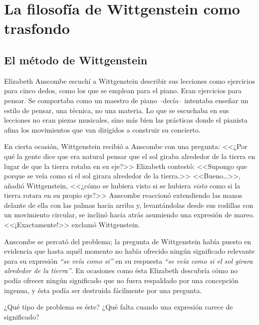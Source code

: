 \section{La filosofía de Wittgenstein como trasfondo}

\subsection{El método de Wittgenstein}

Elizabeth Anscombe escuchí a Wittgenstein describir sus lecciones como
ejercicios para cinco dedos, como los que se emplean para el piano. Eran
ejercicios para pensar. Se comportaba como un maestro de piano --decía--
intentaba enseñar un estilo de pensar, una técnica, no una materia. Lo que se
escuchaba en sus lecciones no eran piezas musicales, sino más bien las prácticas
donde el pianista afina los movimientos que van dirigidos a construir su
concierto.\autocite[cf.~][p.~357]{pubnpriv}

En cierta ocasión, Wittgenstein recibió a Anscombe con una pregunta: <<¿Por qué
la gente dice que era natural pensar que el sol giraba alrededor de la tierra en
lugar de que la tierra rotaba en su eje?>> Elizabeth contestó: <<Supongo que
porque se veía como si el sol girara alrededor de la tierra.>> <<Bueno\ldots>>,
añadió Wittgenstein, <<¿cómo se hubiera visto si se hubiera \emph{visto} como si
la tierra rotara en su propio eje?>> Anscombe reaccionó extendiendo las manos
delante de ella con las palmas hacia arriba y, levantándolas desde sus rodillas
con un movimiento circular, se inclinó hacia atrás asumiendo una expresión de
mareo. <<¡Exactamente!>> exclamó Wittgenstein.\autocite[cf.~][p.~151]{IWT}

Anscombe se percató del problema; la pregunta de Wittgenstein había puesto en
evidencia que hasta aquél momento no había ofrecido ningún significado relevante
para su expresión \emph{``se veía como si''} en su respuesta \emph{``se veía
  como si el sol girara alrededor de la tierra''}. En ocasiones como ésta
Elizabeth descubría cómo no podía ofrecer ningún significado que no fuera
respaldado por una concepción ingenua, y ésta podía ser destruida fácilmente por
una pregunta. 

¿Qué tipo de problema es éste? ¿Qué falta cuando una expresión carece de
significado?

